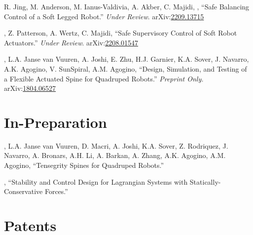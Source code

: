 \documentclass[letterpaper]{deedy-resume} %
\newcommand\arxivlink[1]{\href{https://arxiv.org/abs/#1}{#1}}
\newcommand\arxiv[1]{arXiv:\arxivlink{#1}}
\newcommand{\myname}{\underline{{\fontdescript{A.P. Sabelhaus}}}}
\begin{document}
{\vspace{0.2cm}

\begin{etaremune}[itemsep=0.1cm]

\item R. Jing, M. Anderson, M. Ianus-Valdivia, A. Akber, C. Majidi, \myname, ``Safe Balancing Control of a Soft Legged Robot.'' {\it Under Review}. \arxiv{2209.13715}

\item \underline{{}}, Z. Patterson, A. Wertz, C. Majidi, ``Safe Supervisory Control of Soft Robot Actuators.'' {\it Under Review}. \arxiv{2208.01547}

\item \underline{{}}, L.A. Janse van Vuuren, A. Joshi, E. Zhu, H.J. Garnier, K.A. Sover, J. Navarro, A.K. Agogino, V. SunSpiral, A.M. Agogino, ``Design, Simulation, and Testing of a Flexible Actuated Spine for Quadruped Robots.'' {\it Preprint Only.} \arxiv{1804.06527}


\end{etaremune}  

  
\section{In-Preparation}

\vspace{0.1cm}

\begin{etaremune}[itemsep=0.1cm]

\item \underline{{}}, L.A. Janse van Vuuren, D. Macri, A. Joshi, K.A. Sover, Z. Rodriquez, J. Navarro, A. Bronars, A.H. Li, A. Barkan, A. Zhang, A.K. Agogino, A.M. Agogino, ``Tensegrity Spines for Quadruped Robots.''

\item \underline{{}}, ``Stability and Control Design for Lagrangian Systems with Statically-Conservative Forces.''

\end{etaremune}


\section{Patents}

}
\end{document}
